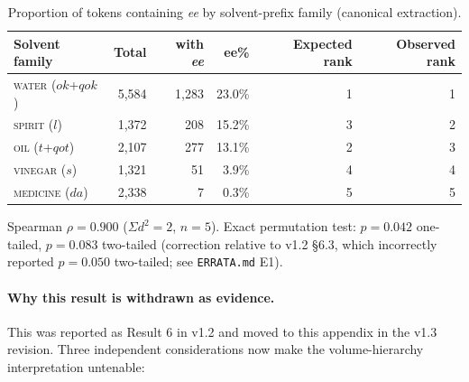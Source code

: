 \documentclass[11pt,a4paper]{article}
\begin{document}
\begin{table}[H]
\centering
\small
\begin{tabular}{lrrrrr}
\toprule
\textbf{Solvent family} & \textbf{Total} & \textbf{with \textit{ee}} & \textbf{ee\%} & \textbf{Expected rank} & \textbf{Observed rank} \\
\midrule
\textsc{water} ($ok$+$qok$) & 5{,}584 & 1{,}283 & 23.0\% & 1 & 1 \\
\textsc{spirit} ($l$)        & 1{,}372 &   208 & 15.2\% & 3 & 2 \\
\textsc{oil} ($t$+$qot$)     & 2{,}107 &   277 & 13.1\% & 2 & 3 \\
\textsc{vinegar} ($s$)       & 1{,}321 &    51 &  3.9\% & 4 & 4 \\
\textsc{medicine} ($da$)     & 2{,}338 &     7 &  0.3\% & 5 & 5 \\
\bottomrule
\end{tabular}
\caption{Proportion of tokens containing \textit{ee} by solvent-prefix family (canonical extraction).}
\end{table}

\noindent Spearman $\rho = 0.900$ ($\Sigma d^2 = 2$, $n = 5$). Exact permutation test: $p = 0.042$ one-tailed, $p = 0.083$ two-tailed (correction relative to v1.2 \S 6.3, which incorrectly reported $p = 0.050$ two-tailed; see \texttt{ERRATA.md} E1).

\paragraph{Why this result is withdrawn as evidence.} This was reported as Result 6 in v1.2 and moved to this appendix in the v1.3 revision. Three independent considerations now make the volume-hierarchy interpretation untenable:
\end{document}
